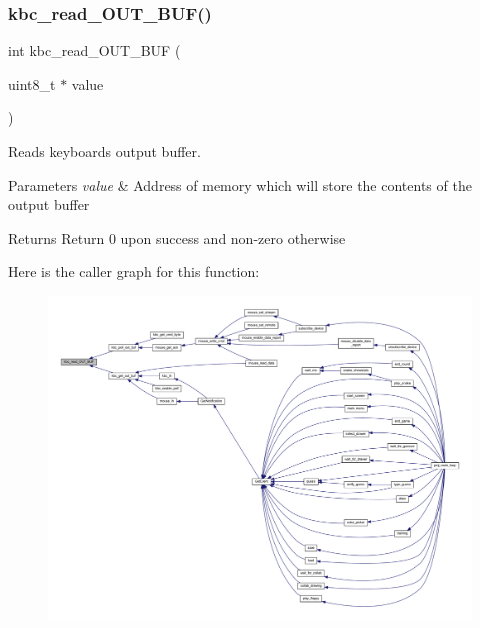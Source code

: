 \mbox{\label{group__keyboard_ga870b444bcf2b470834d2027dc30bb46e}} 
\subsubsection{\texorpdfstring{kbc\+\_\+read\+\_\+\+O\+U\+T\+\_\+\+B\+U\+F()}{kbc\_read\_OUT\_BUF()}}
{\footnotesize\ttfamily int kbc\+\_\+read\+\_\+\+O\+U\+T\+\_\+\+B\+UF (\begin{DoxyParamCaption}\item[{uint8\+\_\+t $\ast$}]{value }\end{DoxyParamCaption})}



Reads keyboard\textquotesingle{}s output buffer. 


\begin{DoxyParams}{Parameters}
{\em value} & Address of memory which will store the contents of the output buffer \\
\hline
\end{DoxyParams}
\begin{DoxyReturn}{Returns}
Return 0 upon success and non-\/zero otherwise 
\end{DoxyReturn}
Here is the caller graph for this function\+:\nopagebreak
\begin{figure}[H]
\begin{center}
\leavevmode
\includegraphics[width=350pt]{group__keyboard_ga870b444bcf2b470834d2027dc30bb46e_icgraph}
\end{center}
\end{figure}
\mbox{\label{group__keyboard_gabed7ca5d360dbf3737554bd242d48fc1}} 
